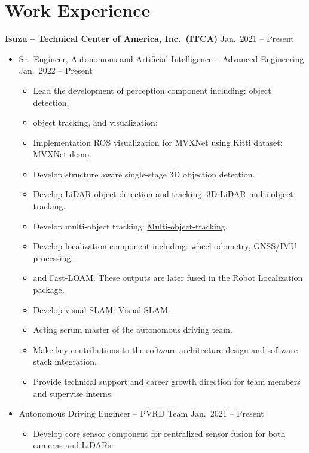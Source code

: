 \documentclass[a4paper,10pt,dvipdfmx]{article}
\begin{document}
\section*{Work Experience}
\textbf{Isuzu -- Technical Center of America, Inc.~(ITCA)} \hfill Jan.~2021 -- Present
\begin{itemize}[noitemsep,nolistsep]
  \item[] Sr.~Engineer, Autonomous and Artificial Intelligence -- Advanced Engineering \hfill Jan.~2022 -- Present
    \begin{itemize}[noitemsep,nolistsep]
      \item Lead the development of perception component including: object detection,
      \item[] object tracking, and visualization:
      \item[] Implementation ROS visualization for MVXNet using Kitti dataset: \href{https://youtu.be/LQHUm6AnVdg}{MVXNet demo}.
      \item[] Develop structure aware single-stage 3D objection detection.
      \item[] Develop LiDAR object detection and tracking: \href{https://youtu.be/hfo4PdJBrFU}{3D-LiDAR multi-object tracking}.
      \item[] Develop multi-object tracking: \href{https://youtu.be/WCiK4gFPqtM}{Multi-object-tracking}.
      \item Develop localization component including: wheel odometry, GNSS/IMU processing,
      \item[] and Fast-LOAM. These outputs are later fused in the Robot Localization package.
      \item[] Develop visual SLAM: \href{https://youtu.be/Z5XTmDap_Pk}{Visual SLAM}.
      \item Acting scrum master of the autonomous driving team.
      \item Make key contributions to the software architecture design and software stack integration.
      \item Provide technical support and career growth direction for team members and supervise interns.
    \end{itemize}
  \item[] Autonomous Driving Engineer -- PVRD Team \hfill Jan.~2021 -- Present
    \begin{itemize}[noitemsep,nolistsep]
      \item Develop core sensor component for centralized sensor fusion for both cameras and LiDARs.

\end{itemize}
\end{itemize}
\end{document}
